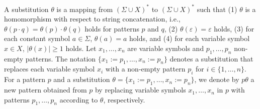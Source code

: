 A substitution $\theta$ is a mapping from $(\Sigma \cup X)^{\ast}$ to $(\Sigma \cup X)^{\ast}$ such that
(1) $\theta$ is a homomorphism with respect to string concatenation, i.e., $\theta(p \cdot q) = \theta(p) \cdot \theta(q)$ holds for patterns $p$ and $q$,
(2) $\theta(\varepsilon)=\varepsilon$ holds,
(3) for each constant symbol $a \in \Sigma$, $\theta(a) = a$ holds,
and (4) for each variable symbol $x \in X$, $|\theta(x)| \geq 1$ holds.
Let $x_{1},\ldots,x_{n}$ are variable symbols and $p_{1},\ldots,p_{n}$ non-empty patterns.
The notation $\{x_{1}:=p_{1},\ldots,x_{n}:=p_{n}\}$ denotes a substitution that replaces each variable symbol $x_{i}$
with a non-empty pattern $p_{i}$ for $i \in \{1,\ldots,n\}$.
For a pattern $p$ and a substitution $\theta=\{x_{1}:=p_{1},\ldots,x_{n}:=p_{n}\}$, we denote by $p\theta$ a new pattern obtained from $p$ by replacing variable symbols $x_1,\ldots,x_n$ in $p$ with patterns $p_1,\ldots,p_n$ according to $\theta$, respectively.
%

